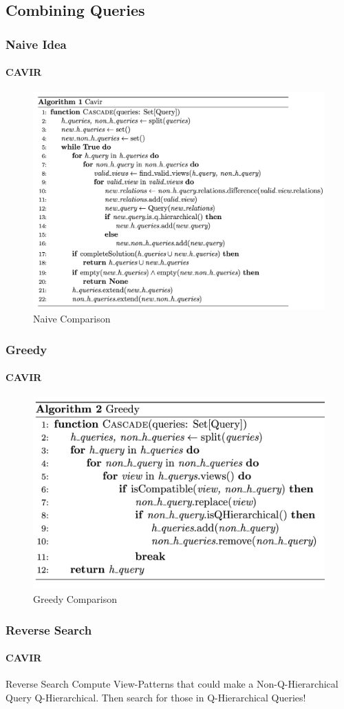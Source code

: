 \documentclass[
	11pt, %
]{beamer}
\begin{document}
\subsection{Combining Queries}
\begin{frame}
	\frametitle{Naive Idea}
	\framesubtitle{CAVIR}
	\begin{figure}
		\includegraphics[height=0.7\textheight]{Naive.png}
		\caption{Naive Comparison}
	\end{figure}
\end{frame}
\begin{frame}
	\frametitle{Greedy}
	\framesubtitle{CAVIR}
		\begin{figure}
		\includegraphics[height=0.7\textheight]{Greedy.png}
		\caption{Greedy Comparison}
	\end{figure}
\end{frame}
\begin{frame}
	\frametitle{Reverse Search}
	\framesubtitle{CAVIR}
	\begin{block}{Reverse Search}
		Compute View-Patterns that could make a Non-Q-Hierarchical Query Q-Hierarchical. Then search for those in Q-Hierarchical Queries!
	\end{block}
\end{frame}
\end{document}
